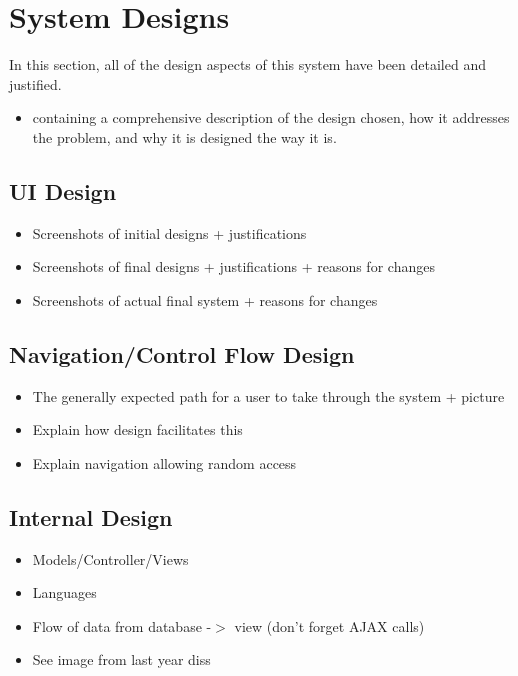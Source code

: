 \section{System Designs}
In this section, all of the design aspects of this system have been detailed and justified. 

{\color{red}
	\begin{itemize}
		\item containing a comprehensive description of the design chosen, how it addresses the problem, and why it is designed the way it is.
	\end{itemize}
}


\subsection{UI Design}
{\color{red}
	\begin{itemize}
		\item Screenshots of initial designs + justifications
		\item Screenshots of final designs + justifications + reasons for changes
		\item Screenshots of actual final system + reasons for changes
	\end{itemize}
}

\subsection{Navigation/Control Flow Design}	
\label{subsec:nav}	

{\color{red}
	\begin{itemize}
		\item The generally expected path for a user to take through the system + picture
		\item Explain how design facilitates this
		\item Explain navigation allowing random access		
	\end{itemize}
}

\subsection{Internal Design}
{\color{red}
	\begin{itemize}
		\item Models/Controller/Views
		\item Languages
		\item Flow of data from database -$>$ view (don't forget AJAX calls)
		\item See image from last year diss
	\end{itemize}
}
